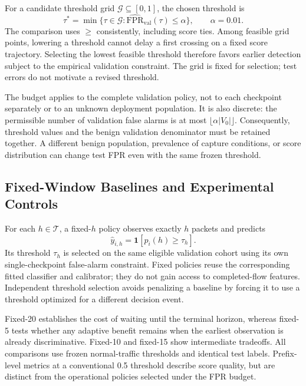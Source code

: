 \documentclass[conference]{IEEEtran}
\begin{document}
For a candidate threshold grid $\mathcal{G}\subseteq[0,1]$, the chosen threshold is
\begin{equation}
\tau^*=\min\{\tau\in\mathcal{G}:
\widehat{\mathrm{FPR}}_{\mathrm{val}}(\tau)\le\alpha\},
\qquad \alpha=0.01.
\label{eq:threshold_selection}
\end{equation}
The comparison uses $\ge$ consistently, including score ties. Among feasible grid points, lowering a threshold cannot delay a first crossing on a fixed score trajectory. Selecting the lowest feasible threshold therefore favors earlier detection subject to the empirical validation constraint. The grid is fixed for selection; test errors do not motivate a revised threshold.

The budget applies to the complete validation policy, not to each checkpoint separately or to an unknown deployment population. It is also discrete: the permissible number of validation false alarms is at most $\lfloor\alpha|V_0|\rfloor$. Consequently, threshold values and the benign validation denominator must be retained together. A different benign population, prevalence of capture conditions, or score distribution can change test FPR even with the same frozen threshold.

\subsection{Fixed-Window Baselines and Experimental Controls}
For each $h\in\mathcal{T}$, a fixed-$h$ policy observes exactly $h$ packets and predicts
\begin{equation}
\widehat{y}_{i,h}=\mathbf{1}[p_i(h)\ge\tau_h].
\label{eq:fixed_policy}
\end{equation}
Its threshold $\tau_h$ is selected on the same eligible validation cohort using its own single-checkpoint false-alarm constraint. Fixed policies reuse the corresponding fitted classifier and calibrator; they do not gain access to completed-flow features. Independent threshold selection avoids penalizing a baseline by forcing it to use a threshold optimized for a different decision event.

Fixed-20 establishes the cost of waiting until the terminal horizon, whereas fixed-5 tests whether any adaptive benefit remains when the earliest observation is already discriminative. Fixed-10 and fixed-15 show intermediate tradeoffs. All comparisons use frozen normal-traffic thresholds and identical test labels. Prefix-level metrics at a conventional 0.5 threshold describe score quality, but are distinct from the operational policies selected under the FPR budget.
\end{document}

